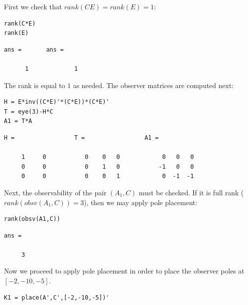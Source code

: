 \documentclass{amsart}
\theoremstyle{definition}
\theoremstyle{remark}
\numberwithin{equation}{section}
\begin{document}
\begin{par}
\noindent First we check that $rank(CE) = rank(E) = 1$:
\end{par}
\begin{verbatim}
rank(C*E)
rank(E)
\end{verbatim}

        \color{lightgray} \begin{verbatim}
ans =       ans =

      1             1
\end{verbatim} \color{black}

\begin{par}
The rank is equal to $1$ as needed. The observer matrices are computed next:
\end{par}


\begin{verbatim}
H = E*inv((C*E)'*(C*E))*(C*E)'
T = eye(3)-H*C
A1 = T*A
\end{verbatim}
        \color{lightgray} \begin{verbatim}
H =                 T =                 A1 =

     1     0           0    0   0            0   0   0
     0     0           0    1   0           -1   0   0
     0     0           0    0   1            0  -1  -1

\end{verbatim} \color{black}

\begin{par}
Next, the observability of the pair $(A_1,C)$ must be checked. If it is full rank ($rank(obsv(A_1,C))=3$), then we may apply pole placement:
\end{par}
\begin{verbatim}
rank(obsv(A1,C))
\end{verbatim}

        \color{lightgray} \begin{verbatim}
ans =

     3

\end{verbatim} \color{black}

Now we proceed to apply pole placement in order to place the observer poles at $[-2,-10,-5]$.

\begin{verbatim}
K1 = place(A',C',[-2,-10,-5])'
\end{verbatim}
\end{document}
